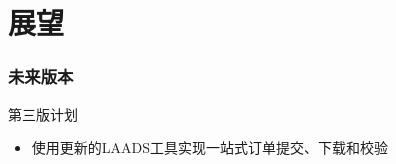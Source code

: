 \section{展望}
\begin{frame}
    \frametitle{未来版本}
    第三版计划
    \begin{itemize}
        \item 使用更新的LAADS工具实现一站式订单提交、下载和校验
    \end{itemize}
\end{frame}